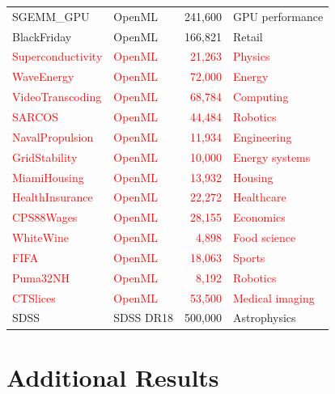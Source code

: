 \documentclass{article}
\begin{document}
\begin{table}[p]
\begin{tabular}{llrl}
SGEMM\_GPU       & OpenML &  241{,}600 & GPU performance \\
BlackFriday      & OpenML &  166{,}821 & Retail \\
\textcolor{red}{Superconductivity} & \textcolor{red}{OpenML} & \textcolor{red}{21{,}263} & \textcolor{red}{Physics} \\
\textcolor{red}{WaveEnergy}        & \textcolor{red}{OpenML} & \textcolor{red}{72{,}000} & \textcolor{red}{Energy} \\
\textcolor{red}{VideoTranscoding}  & \textcolor{red}{OpenML} & \textcolor{red}{68{,}784} & \textcolor{red}{Computing} \\
\textcolor{red}{SARCOS}            & \textcolor{red}{OpenML} & \textcolor{red}{44{,}484} & \textcolor{red}{Robotics} \\
\textcolor{red}{NavalPropulsion}   & \textcolor{red}{OpenML} & \textcolor{red}{11{,}934} & \textcolor{red}{Engineering} \\
\textcolor{red}{GridStability}     & \textcolor{red}{OpenML} & \textcolor{red}{10{,}000} & \textcolor{red}{Energy systems} \\
\textcolor{red}{MiamiHousing}      & \textcolor{red}{OpenML} & \textcolor{red}{13{,}932} & \textcolor{red}{Housing} \\
\textcolor{red}{HealthInsurance}   & \textcolor{red}{OpenML} & \textcolor{red}{22{,}272} & \textcolor{red}{Healthcare} \\
\textcolor{red}{CPS88Wages}        & \textcolor{red}{OpenML} & \textcolor{red}{28{,}155} & \textcolor{red}{Economics} \\
\textcolor{red}{WhiteWine}         & \textcolor{red}{OpenML} &  \textcolor{red}{4{,}898} & \textcolor{red}{Food science} \\
\textcolor{red}{FIFA}              & \textcolor{red}{OpenML} & \textcolor{red}{18{,}063} & \textcolor{red}{Sports} \\
\textcolor{red}{Puma32NH}          & \textcolor{red}{OpenML} &  \textcolor{red}{8{,}192} & \textcolor{red}{Robotics} \\
\textcolor{red}{CTSlices}          & \textcolor{red}{OpenML} & \textcolor{red}{53{,}500} & \textcolor{red}{Medical imaging} \\
SDSS             & SDSS DR18 & 500{,}000 & Astrophysics \\
\bottomrule
\end{tabular}
\end{table}


\section{Additional Results}
\end{document}
